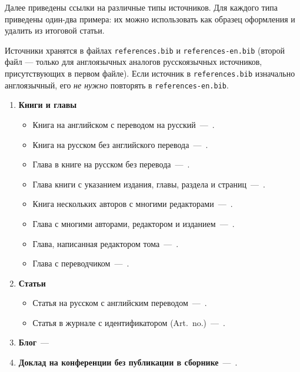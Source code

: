 \documentclass[eqsecnum,authorsinfo]{kioj6}
\begin{document}
    Далее приведены ссылки на различные типы источников. Для каждого
    типа приведены один-два примера: их можно использовать как образец
    оформления и удалить из итоговой статьи.

    Источники хранятся в файлах
    \texttt{references.bib} и \texttt{references-en.bib} (второй файл --- только
    для англоязычных аналогов русскоязычных источников, присутствующих в первом файле).
    Если источник в \texttt{references.bib} изначально англоязычный, его \textit{не нужно} повторять
    в \texttt{references-en.bib}.
    
    \begin{enumerate}
        \item \textbf{Книги и главы} 
        \begin{itemize}[nosep]
            \item Книга на английском с переводом на русский~---~\cite{Hairer}.
            \item Книга на русском без английского перевода~---~\cite{Gubanov}.
            \item Глава в книге на русском без перевода~---~\cite{layexpl7}.
            \item Глава книги с указанием издания, главы, раздела и страниц~---~\cite{ogura}.
            \item Книга нескольких авторов с многими редакторами~---~\cite{HastieTibshiraniFriedman2009}.
            \item Глава с многими авторами, редактором и изданием~---~\cite{Alberts2014CellCycle}.
            \item Глава, написанная редактором тома~---~\cite{Gowers2008LanguageGrammar}.
            \item Глава с переводчиком~---~\cite{Aleksandrov1963GeneralView}.
        \end{itemize}

        \item \textbf{Статьи}
        \begin{itemize}[nosep]
            \item Статья на русском с английским переводом~---~\cite{Matveenko}.
            \item Статья в журнале с идентификатором (Art.~no.)~---~\cite{Abbott2016GW150914}.
        \end{itemize}

        \item \textbf{Блог}~---~\cite{Dmitry2024Python}

        \item \textbf{Доклад на конференции без публикации в сборнике}~---~\cite{Caratelli}.


\end{enumerate}
\end{document}

